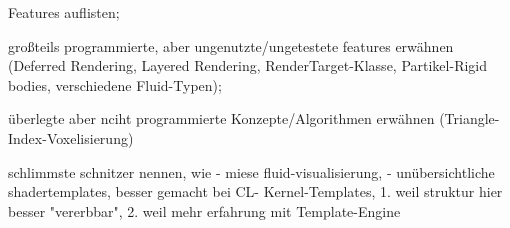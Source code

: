 	Features auflisten;

	großteils programmierte, aber ungenutzte/ungetestete features erwähnen (Deferred Rendering, Layered Rendering, 	
	RenderTarget-Klasse, Partikel-Rigid bodies, verschiedene Fluid-Typen); 


	überlegte aber nciht programmierte Konzepte/Algorithmen erwähnen (Triangle-Index-Voxelisierung)
	
	schlimmste schnitzer nennen, wie
		- miese fluid-visualisierung, 
		- unübersichtliche shadertemplates, besser gemacht bei CL-
			Kernel-Templates, 1. weil struktur hier besser "vererbbar", 2. weil mehr erfahrung mit  Template-Engine
	
	  	
  	

\clearpage
